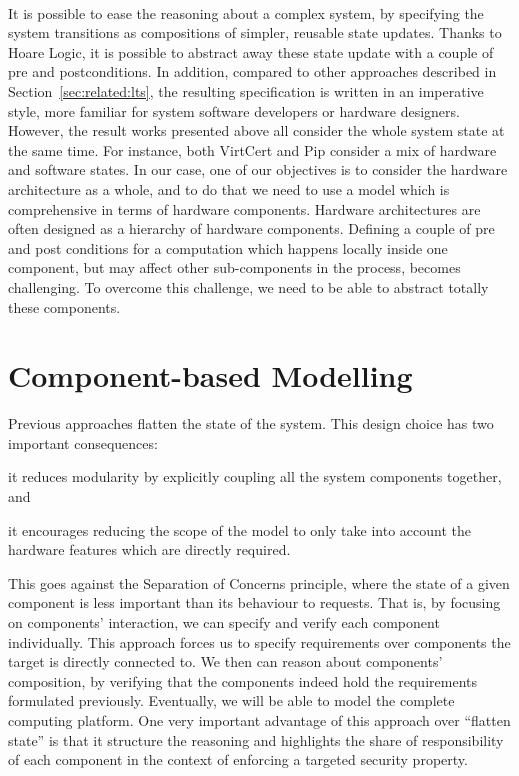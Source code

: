 \paragraph{}
%
It is possible to ease the reasoning about a complex system, by specifying the
system transitions as compositions of simpler, reusable state updates.
%
Thanks to Hoare Logic, it is possible to abstract away these state update with a
couple of pre and postconditions.
%
In addition, compared to other approaches described in
Section~\ref{sec:related:lts}, the resulting specification is written in an
imperative style, more familiar for system software developers or hardware
designers.
%
However, the result works presented above all consider the whole system state at
the same time.
%
For instance, both VirtCert and Pip consider a mix of hardware and software
states.
%
In our case, one of our objectives is to consider the hardware architecture as a
whole, and to do that we need to use a model which is comprehensive in terms of
hardware components.
%
Hardware architectures are often designed as a hierarchy of hardware components.
%
Defining a couple of pre and post conditions for a computation which happens
locally inside one component, but may affect other sub-components in the
process, becomes challenging.
%
To overcome this challenge, we need to be able to abstract totally these
components.

\section{Component-based Modelling} %
\label{sec:related:interface}

Previous approaches flatten the state of the system.
%
This design choice has two important consequences:
%
\begin{inparaenum}[(1)]
%
\item it reduces modularity by explicitly coupling all the system components
  together, and
%
\item it encourages reducing the scope of the model to only take into account
  the hardware features which are directly required.
%
\end{inparaenum}
%
This goes against the Separation of Concerns principle, where the state of a
given component is less important than its behaviour to requests.
%
That is, by focusing on components' interaction, we can specify and verify each
component individually.
%
This approach forces us to specify requirements over components the target is directly
connected to.
%
We then can reason about components’ composition, by verifying that the
components indeed hold the requirements formulated previously.
%
Eventually, we will be able to model the complete computing platform.
%
One very important advantage of this approach over ``flatten state'' is that it
structure the reasoning and highlights the share of responsibility of each
component in the context of enforcing a targeted security property.


